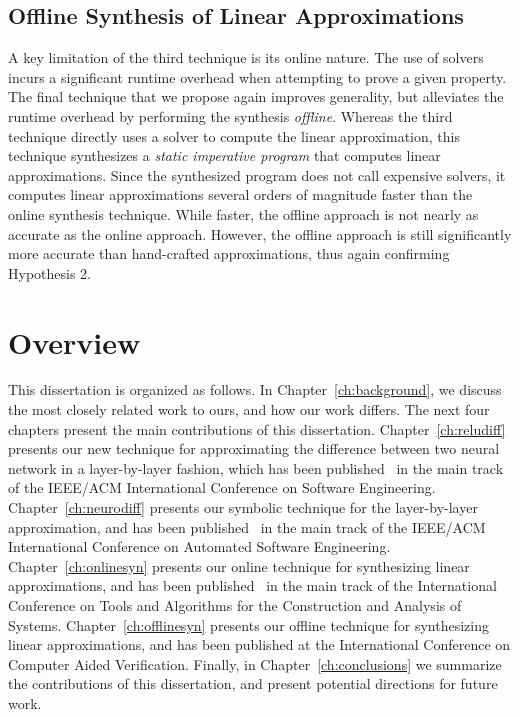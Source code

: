 \subsection{Offline Synthesis of Linear Approximations}
A key limitation of the third technique is its online nature. The use of solvers
incurs a significant runtime overhead when attempting to prove a given property. The
final technique that we propose again improves generality, but
alleviates the runtime overhead by performing the synthesis \textit{offline}.
Whereas the third technique directly uses a solver to compute the linear
approximation, this technique synthesizes a \textit{static imperative program}
that computes linear approximations. Since the synthesized program does not call
expensive solvers, it computes linear approximations several orders of magnitude
faster than the online synthesis technique. While faster, the offline approach is
not nearly as accurate as the online approach. However, the offline approach is
still significantly more accurate than hand-crafted approximations, thus again
confirming Hypothesis 2.

\section{Overview}
This dissertation is organized as follows. In Chapter~\ref{ch:background}, we
discuss the most closely related work to ours, and how our work differs. The next
four chapters present the main contributions of this dissertation.
Chapter~\ref{ch:reludiff} presents our new technique for approximating the
difference between two neural network in a layer-by-layer fashion, which has been
published~\cite{paulsen2020reludiff} in the main track of the IEEE/ACM
International Conference on Software Engineering. Chapter~\ref{ch:neurodiff}
presents our symbolic technique for the layer-by-layer approximation, and has been
published~\cite{paulsen2020neurodiff} in the main track of the IEEE/ACM
International Conference on Automated Software Engineering.
Chapter~\ref{ch:onlinesyn} presents our online technique for synthesizing linear
approximations, and has been published~\cite{paulsen2022linsyn} in the main track
of the International Conference on Tools and Algorithms for the Construction and
Analysis of Systems. Chapter~\ref{ch:offlinesyn} presents our offline technique
for synthesizing linear approximations, and has been published at the
International Conference on Computer Aided Verification.
Finally, in Chapter~\ref{ch:conclusions} we summarize the contributions of this
dissertation, and present potential directions for future work.
